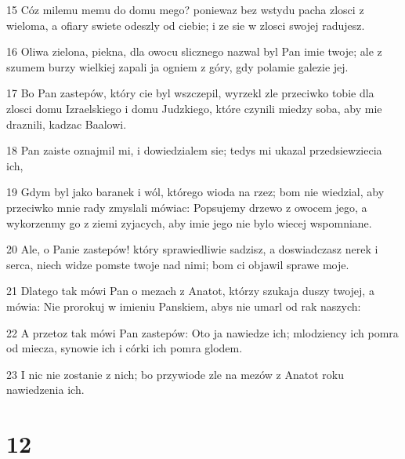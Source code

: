 \par 15 Cóz milemu memu do domu mego? poniewaz bez wstydu pacha zlosci z wieloma, a ofiary swiete odeszly od ciebie; i ze sie w zlosci swojej radujesz.
\par 16 Oliwa zielona, piekna, dla owocu slicznego nazwal byl Pan imie twoje; ale z szumem burzy wielkiej zapali ja ogniem z góry, gdy polamie galezie jej.
\par 17 Bo Pan zastepów, który cie byl wszczepil, wyrzekl zle przeciwko tobie dla zlosci domu Izraelskiego i domu Judzkiego, które czynili miedzy soba, aby mie draznili, kadzac Baalowi.
\par 18 Pan zaiste oznajmil mi, i dowiedzialem sie; tedys mi ukazal przedsiewziecia ich,
\par 19 Gdym byl jako baranek i wól, którego wioda na rzez; bom nie wiedzial, aby przeciwko mnie rady zmyslali mówiac: Popsujemy drzewo z owocem jego, a wykorzenmy go z ziemi zyjacych, aby imie jego nie bylo wiecej wspomniane.
\par 20 Ale, o Panie zastepów! który sprawiedliwie sadzisz, a doswiadczasz nerek i serca, niech widze pomste twoje nad nimi; bom ci objawil sprawe moje.
\par 21 Dlatego tak mówi Pan o mezach z Anatot, którzy szukaja duszy twojej, a mówia: Nie prorokuj w imieniu Panskiem, abys nie umarl od rak naszych:
\par 22 A przetoz tak mówi Pan zastepów: Oto ja nawiedze ich; mlodziency ich pomra od miecza, synowie ich i córki ich pomra glodem.
\par 23 I nic nie zostanie z nich; bo przywiode zle na mezów z Anatot roku nawiedzenia ich.

\chapter{12}

